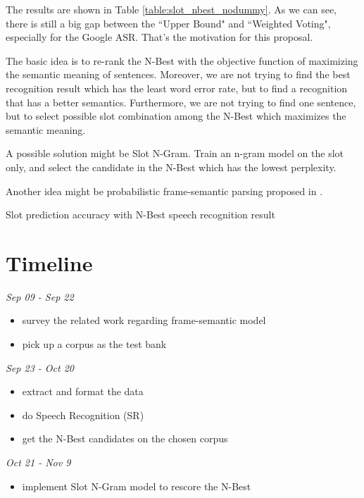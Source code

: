 \documentclass[11pt,letterpaper]{article}
\begin{document}
The results are shown in Table \ref{table:slot_nbest_nodummy}. As we can see, there is still a big gap between the ``Upper Bound" and ``Weighted Voting", especially for the Google ASR. That's the motivation for this proposal.

The basic idea is to re-rank the N-Best with the objective function of maximizing the semantic meaning of sentences. Moreover, we are not trying to find the best recognition result which has the least word error rate, but to find a recognition that has a better semantics. Furthermore, we are not trying to find one sentence, but to select possible slot combination among the N-Best which maximizes the semantic meaning.

A possible solution might be Slot N-Gram. Train an n-gram model on the slot only, and select the candidate in the N-Best which has the lowest perplexity.

Another idea might be probabilistic frame-semantic parsing proposed in \cite{Das:2010}.

\begin{table*}[!htb] 
\centering 
 
\caption{Slot prediction accuracy with N-Best speech recognition result} 
\label{table:slot_nbest_nodummy} 
\end{table*} 

\section{Timeline}

\noindent \emph{Sep 09 - Sep 22}
\begin{itemize}
  \item survey the related work regarding frame-semantic model
  \item pick up a corpus as the test bank
\end{itemize}

\noindent \emph{Sep 23 -  Oct 20}
\begin{itemize}
  \item extract and format the data
  \item do Speech Recognition (SR)
  \item get the N-Best candidates on the chosen corpus
\end{itemize}

\noindent \emph{Oct 21 - Nov 9}
\begin{itemize}
  \item implement Slot N-Gram model to rescore the N-Best
\end{itemize}
\end{document}
